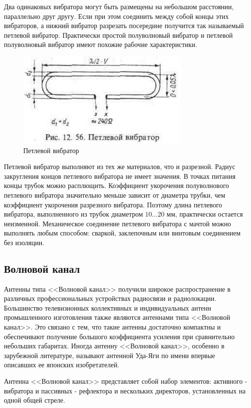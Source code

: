 Два одинаковых вибратора могут быть размещены на небольшом расстоянии, параллельно друг другу. Если при этом соединить между собой концы этих вибраторов, а нижний вибратор разрезать посередине получится так называемый петлевой вибратор. Практически простой полуволновый вибратор и петлевой полуволновый вибратор имеют похожие рабочие характеристики.

\begin{figure}[H]
    \centering
    \includegraphics{img/petl.jpg}
    \caption{Петлевой вибратор}
\end{figure}

Петлевой вибратор выполняют из тех же материалов, что и разрезной. Радиус закругления концов петлевого вибратора не имеет значения. В точках питания концы трубок можно расплющить. Коэффициент укорочения полуволнового петлевого вибратора значительно меньше зависит от диаметра трубки, чем коэффициент укорочения разрезного вибратора. Поэтому длина петлевого вибратора, выполненного из трубок диаметром $10 ... 20$ мм, практически остается неизменной. Механическое соединение петлевого вибратора с мачтой можно выполнять любым способом: сваркой, заклепочным или винтовым соединением без изоляции.


\subsection{Волновой канал}

Антенны типа <<Волновой канал>> получили широкое распространение в различных профессиональных устройствах радиосвязи и радиолокации. Большинство телевизионных коллективных и индивидуальных антенн промышленного изготовления также являются антеннами типа <<Волновой канал>>. Это связано с тем, что такие антенны достаточно компактны и обеспечивают получение большого коэффициента усиления при сравнительно небольших габаритах. Иногда антенну <<Волновой канал>>, особенно в зарубежной литературе, называют антенной Уда-Яги по имени впервые описавших ее японских изобретателей.

Антенна <<Волновой канал>> представляет собой набор элементов: активного - вибратора и пассивных - рефлектора и нескольких директоров, установленных на одной общей стреле.

